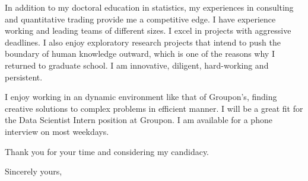 \documentclass{letter} %
\begin{document}
\begin{letter}
In addition to my doctoral education in statistics, my experiences in consulting and quantitative trading provide me a competitive edge. I have experience working and leading teams of different sizes. I excel in projects with aggressive deadlines. I also enjoy exploratory research projects that intend to push the boundary of human knowledge outward, which is one of the reasons why I returned to graduate school. I am innovative, diligent, hard-working and persistent. 

\noindent %
I enjoy working in an dynamic environment like that of Groupon's, finding creative solutions to complex problems in efficient manner. I will be a great fit for the Data Scientist Intern position at Groupon. I am available for a phone interview on most weekdays. 

Thank you for your time and considering my candidacy. 
 
\closing{Sincerely yours,} 
 
 

\end{letter}
\end{document}
